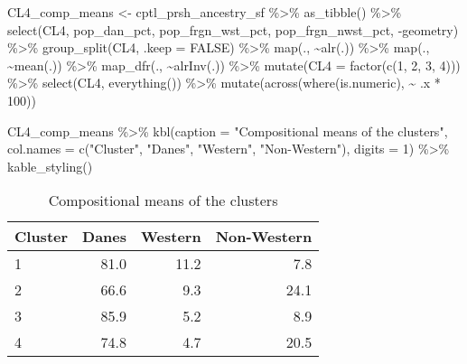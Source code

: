 \documentclass[
  12pt,
]{article}
\newenvironment{Shaded}{\begin{snugshade}}{\end{snugshade}}
\newcommand{\AttributeTok}[1]{\textcolor[rgb]{0.77,0.63,0.00}{#1}}
\newcommand{\ConstantTok}[1]{\textcolor[rgb]{0.00,0.00,0.00}{#1}}
\newcommand{\DecValTok}[1]{\textcolor[rgb]{0.00,0.00,0.81}{#1}}
\newcommand{\FunctionTok}[1]{\textcolor[rgb]{0.00,0.00,0.00}{#1}}
\newcommand{\NormalTok}[1]{#1}
\newcommand{\OtherTok}[1]{\textcolor[rgb]{0.56,0.35,0.01}{#1}}
\newcommand{\SpecialCharTok}[1]{\textcolor[rgb]{0.00,0.00,0.00}{#1}}
\newcommand{\StringTok}[1]{\textcolor[rgb]{0.31,0.60,0.02}{#1}}
\begin{document}
\begin{Shaded}
\begin{Highlighting}[]
\NormalTok{CL4\_comp\_means }\OtherTok{\textless{}{-}}\NormalTok{ cptl\_prsh\_ancestry\_sf }\SpecialCharTok{\%\textgreater{}\%} 
  \FunctionTok{as\_tibble}\NormalTok{() }\SpecialCharTok{\%\textgreater{}\%} 
  \FunctionTok{select}\NormalTok{(CL4, pop\_dan\_pct,  pop\_frgn\_wst\_pct,   pop\_frgn\_nwst\_pct,  }\SpecialCharTok{{-}}\NormalTok{geometry) }\SpecialCharTok{\%\textgreater{}\%}
  \FunctionTok{group\_split}\NormalTok{(CL4, }\AttributeTok{.keep =} \ConstantTok{FALSE}\NormalTok{) }\SpecialCharTok{\%\textgreater{}\%}
  \FunctionTok{map}\NormalTok{(., }\SpecialCharTok{\textasciitilde{}}\FunctionTok{alr}\NormalTok{(.)) }\SpecialCharTok{\%\textgreater{}\%}
  \FunctionTok{map}\NormalTok{(., }\SpecialCharTok{\textasciitilde{}}\FunctionTok{mean}\NormalTok{(.)) }\SpecialCharTok{\%\textgreater{}\%} 
  \FunctionTok{map\_dfr}\NormalTok{(., }\SpecialCharTok{\textasciitilde{}}\FunctionTok{alrInv}\NormalTok{(.)) }\SpecialCharTok{\%\textgreater{}\%} 
  \FunctionTok{mutate}\NormalTok{(}\AttributeTok{CL4 =} \FunctionTok{factor}\NormalTok{(}\FunctionTok{c}\NormalTok{(}\DecValTok{1}\NormalTok{, }\DecValTok{2}\NormalTok{, }\DecValTok{3}\NormalTok{, }\DecValTok{4}\NormalTok{))) }\SpecialCharTok{\%\textgreater{}\%} 
  \FunctionTok{select}\NormalTok{(CL4, }\FunctionTok{everything}\NormalTok{()) }\SpecialCharTok{\%\textgreater{}\%} 
  \FunctionTok{mutate}\NormalTok{(}\FunctionTok{across}\NormalTok{(}\FunctionTok{where}\NormalTok{(is.numeric), }\SpecialCharTok{\textasciitilde{}}\NormalTok{ .x }\SpecialCharTok{*} \DecValTok{100}\NormalTok{))}

\NormalTok{CL4\_comp\_means }\SpecialCharTok{\%\textgreater{}\%} 
  \FunctionTok{kbl}\NormalTok{(}\AttributeTok{caption =} \StringTok{"Compositional means of the clusters"}\NormalTok{,}
      \AttributeTok{col.names =} \FunctionTok{c}\NormalTok{(}\StringTok{"Cluster"}\NormalTok{, }\StringTok{"Danes"}\NormalTok{, }\StringTok{"Western"}\NormalTok{, }\StringTok{"Non{-}Western"}\NormalTok{), }
      \AttributeTok{digits =} \DecValTok{1}\NormalTok{) }\SpecialCharTok{\%\textgreater{}\%}
  \FunctionTok{kable\_styling}\NormalTok{()}
\end{Highlighting}
\end{Shaded}

\begin{table}

\caption{\label{tab:comp-mean}Compositional means of the clusters}
\centering
\begin{tabular}[t]{l|r|r|r}
\hline
Cluster & Danes & Western & Non-Western\\
\hline
1 & 81.0 & 11.2 & 7.8\\
\hline
2 & 66.6 & 9.3 & 24.1\\
\hline
3 & 85.9 & 5.2 & 8.9\\
\hline
4 & 74.8 & 4.7 & 20.5\\
\hline
\end{tabular}
\end{table}
\end{document}
